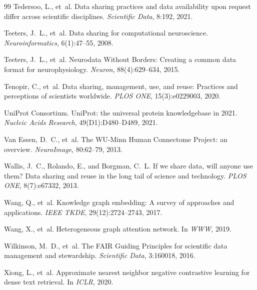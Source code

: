 \documentclass{article}
\theoremstyle{definition}
\begin{document}
\begin{thebibliography}{99}
Tedersoo, L., et~al.
\newblock Data sharing practices and data availability upon request differ across scientific disciplines.
\newblock \emph{Scientific Data}, 8:192, 2021.

Teeters, J.~L., et~al.
\newblock Data sharing for computational neuroscience.
\newblock \emph{Neuroinformatics}, 6(1):47--55, 2008.

Teeters, J.~L., et~al.
\newblock Neurodata Without Borders: Creating a common data format for neurophysiology.
\newblock \emph{Neuron}, 88(4):629--634, 2015.

Tenopir, C., et~al.
\newblock Data sharing, management, use, and reuse: Practices and perceptions of scientists worldwide.
\newblock \emph{PLOS ONE}, 15(3):e0229003, 2020.

UniProt Consortium.
\newblock UniProt: the universal protein knowledgebase in 2021.
\newblock \emph{Nucleic Acids Research}, 49(D1):D480--D489, 2021.

Van Essen, D.~C., et~al.
\newblock The WU-Minn Human Connectome Project: an overview.
\newblock \emph{NeuroImage}, 80:62--79, 2013.

Wallis, J.~C., Rolando, E., and Borgman, C.~L.
\newblock If we share data, will anyone use them? Data sharing and reuse in the long tail of science and technology.
\newblock \emph{PLOS ONE}, 8(7):e67332, 2013.

Wang, Q., et~al.
\newblock Knowledge graph embedding: A survey of approaches and applications.
\newblock \emph{IEEE TKDE}, 29(12):2724--2743, 2017.

Wang, X., et~al.
\newblock Heterogeneous graph attention network.
\newblock In \emph{WWW}, 2019.

Wilkinson, M.~D., et~al.
\newblock The FAIR Guiding Principles for scientific data management and stewardship.
\newblock \emph{Scientific Data}, 3:160018, 2016.

Xiong, L., et~al.
\newblock Approximate nearest neighbor negative contrastive learning for dense text retrieval.
\newblock In \emph{ICLR}, 2020.


\end{thebibliography}
\end{document}
